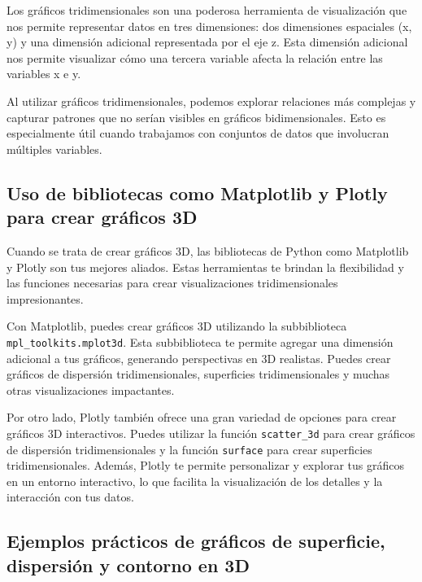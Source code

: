\documentclass[
  a4paper,
]{article}
\begin{document}
Los gráficos tridimensionales son una poderosa herramienta de
visualización que nos permite representar datos en tres dimensiones: dos
dimensiones espaciales (x, y) y una dimensión adicional representada por
el eje z. Esta dimensión adicional nos permite visualizar cómo una
tercera variable afecta la relación entre las variables x e y.

Al utilizar gráficos tridimensionales, podemos explorar relaciones más
complejas y capturar patrones que no serían visibles en gráficos
bidimensionales. Esto es especialmente útil cuando trabajamos con
conjuntos de datos que involucran múltiples variables.

\hypertarget{uso-de-bibliotecas-como-matplotlib-y-plotly-para-crear-gruxe1ficos-3d}{%
\subsection{Uso de bibliotecas como Matplotlib y Plotly para crear
gráficos
3D}\label{uso-de-bibliotecas-como-matplotlib-y-plotly-para-crear-gruxe1ficos-3d}}

Cuando se trata de crear gráficos 3D, las bibliotecas de Python como
Matplotlib y Plotly son tus mejores aliados. Estas herramientas te
brindan la flexibilidad y las funciones necesarias para crear
visualizaciones tridimensionales impresionantes.

Con Matplotlib, puedes crear gráficos 3D utilizando la subbiblioteca
\texttt{mpl\_toolkits.mplot3d}. Esta subbiblioteca te permite agregar
una dimensión adicional a tus gráficos, generando perspectivas en 3D
realistas. Puedes crear gráficos de dispersión tridimensionales,
superficies tridimensionales y muchas otras visualizaciones impactantes.

Por otro lado, Plotly también ofrece una gran variedad de opciones para
crear gráficos 3D interactivos. Puedes utilizar la función
\texttt{scatter\_3d} para crear gráficos de dispersión tridimensionales
y la función \texttt{surface} para crear superficies tridimensionales.
Además, Plotly te permite personalizar y explorar tus gráficos en un
entorno interactivo, lo que facilita la visualización de los detalles y
la interacción con tus datos.

\hypertarget{ejemplos-pruxe1cticos-de-gruxe1ficos-de-superficie-dispersiuxf3n-y-contorno-en-3d}{%
\subsection{Ejemplos prácticos de gráficos de superficie, dispersión y
contorno en
3D}\label{ejemplos-pruxe1cticos-de-gruxe1ficos-de-superficie-dispersiuxf3n-y-contorno-en-3d}}
\end{document}
